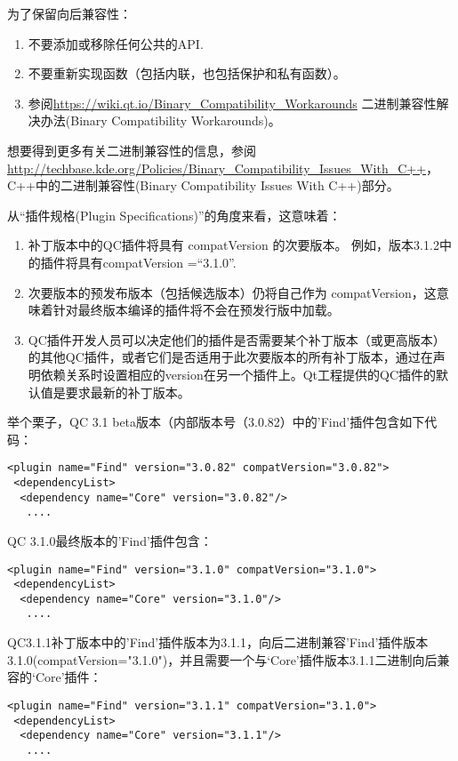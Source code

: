 为了保留向后兼容性：

\begin{enumerate}
	\item 不要添加或移除任何公共的API.
	\item 不要重新实现函数（包括内联，也包括保护和私有函数）。
	\item 参阅\url{https://wiki.qt.io/Binary_Compatibility_Workarounds} 二进制兼容性解决办法(Binary Compatibility Workarounds)。
\end{enumerate}

想要得到更多有关二进制兼容性的信息，参阅\url{http://techbase.kde.org/Policies/Binary_Compatibility_Issues_With_C++}， C++中的二进制兼容性(Binary Compatibility Issues With C++)部分。

从“插件规格(Plugin Specifications)”的角度来看，这意味着：

\begin{enumerate}
	\item 补丁版本中的QC插件将具有 compatVersion 的次要版本。 例如，版本3.1.2中的插件将具有compatVersion =“3.1.0”.
	\item 次要版本的预发布版本（包括候选版本）仍将自己作为 compatVersion，这意味着针对最终版本编译的插件将不会在预发行版中加载。
	\item QC插件开发人员可以决定他们的插件是否需要某个补丁版本（或更高版本）的其他QC插件，或者它们是否适用于此次要版本的所有补丁版本，通过在声明依赖关系时设置相应的version在另一个插件上。Qt工程提供的QC插件的默认值是要求最新的补丁版本。
\end{enumerate}

举个栗子，QC 3.1 beta版本（内部版本号（3.0.82）中的'Find'插件包含如下代码：

\begin{lstlisting}
<plugin name="Find" version="3.0.82" compatVersion="3.0.82">
 <dependencyList>
  <dependency name="Core" version="3.0.82"/>
   ....
\end{lstlisting}

QC 3.1.0最终版本的'Find'插件包含：

\begin{lstlisting}
<plugin name="Find" version="3.1.0" compatVersion="3.1.0">
 <dependencyList>
  <dependency name="Core" version="3.1.0"/>
   ....
\end{lstlisting}

QC3.1.1补丁版本中的'Find'插件版本为3.1.1，向后二进制兼容'Find'插件版本3.1.0(compatVersion="3.1.0")，并且需要一个与‘Core’插件版本3.1.1二进制向后兼容的‘Core’插件：

\begin{lstlisting}
<plugin name="Find" version="3.1.1" compatVersion="3.1.0">
 <dependencyList>
  <dependency name="Core" version="3.1.1"/>
   ....
\end{lstlisting}

